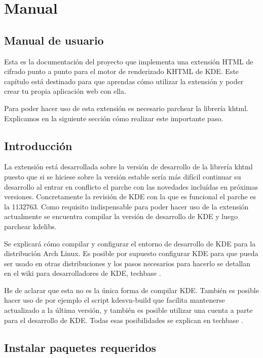 \chapter{Manual}\label{manual}

\section{Manual de usuario}

Esta es la documentación del proyecto que implementa una extensión HTML de cifrado punto a punto para el motor de renderizado KHTML de KDE. Este capítulo está destinado para que aprendas cómo utilizar la extensión y poder crear tu propia aplicación web con ella.

Para poder hacer uso de esta extensión es necesario parchear la librería khtml. Explicamos en la siguiente sección cómo realizar este importante paso.

\section{Introducción}

La extensión está desarrollada sobre la versión de desarrollo de la librería khtml puesto que si se hiciese sobre la versión estable sería más difícil continuar su desarrollo al entrar en conflicto el parche con las novedades incluídas en próximas versiones. Concretamente la revisión de KDE con la que es funcional el parche es la 1132763. Como requisito indispensable para poder hacer uso de la extensión actualmente se encuentra compilar la versión de desarrollo de KDE y luego parchear kdelibs.

Se explicará cómo compilar y configurar el entorno de desarrollo de KDE para la distribución Arch Linux. Es posible por supuesto configurar KDE para que pueda ser usado en otras distribuciones y los pasos necesarios para hacerlo se detallan en el wiki para desarrolladores de KDE, techbase \cite{build_kde4}.

He de aclarar que esta no es la única forma de compilar KDE. También es posible hacer uso de por ejemplo el script kdesvn-build que facilita mantenerse actualizado a la última versión, y también es posible utilizar una cuenta a parte para el desarrollo de KDE. Todas esas posibilidades se explican en techbase \cite{build_kde4}.

\section{Instalar paquetes requeridos}

